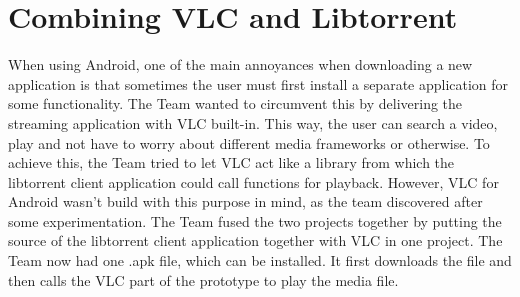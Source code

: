 \section{Combining VLC and Libtorrent}
\thispagestyle{fancy}
\label{sec:one_apk}
When using Android, one of the main annoyances when downloading a new application is that sometimes the user must first install a separate application for some functionality. The Team wanted to circumvent this by delivering the streaming application with VLC built-in. This way, the user can search a video, play and not have to worry about different media frameworks or otherwise. To achieve this, the Team tried to let VLC act like a library from which the libtorrent client application could call functions for playback. However, VLC for Android wasn't build with this purpose in mind, as the team discovered after some experimentation. The Team fused the two projects together by putting the source of the libtorrent client application together with VLC in one project. The Team now had one .apk file, which can be installed. It first downloads the file and then calls the VLC part of the prototype to play the media file. 